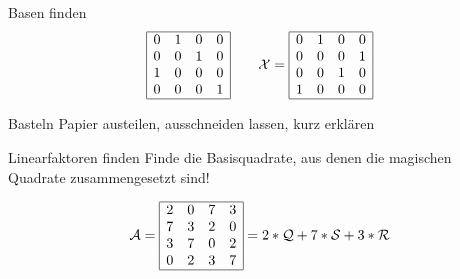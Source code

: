 \documentclass{uebungszettel}
\begin{document}
\begin{aufgabe}{Basen finden}
\begin{align*}
\begin{array}{|cccc|}
		\hline
			0 & 1 & 0 & 0 \\ 
			0 & 0 & 1 & 0 \\ 
			1 & 0 & 0 & 0 \\ 
			0 & 0 & 0 & 1 \\
		\hline
		\end{array}
	\qquad
	\mathcal{X} = 
		\begin{array}{|cccc|}
		\hline
			0 & 1 & 0 & 0 \\ 
			0 & 0 & 0 & 1 \\ 
			0 & 0 & 1 & 0 \\ 
			1 & 0 & 0 & 0 \\
		\hline
		\end{array}   
	 \end{align*}	
\end{aufgabe}

\begin{aufgabe}{Basteln}
	Papier austeilen, ausschneiden lassen, kurz erkl\"aren
\end{aufgabe}

\begin{aufgabe}{Linearfaktoren finden}
	Finde die Basisquadrate, aus denen die magischen Quadrate zusammengesetzt sind!

	\begin{align*}
		\mathcal{A} =
		\begin{array}{|cccc|}
		\hline
			2 & 0 & 7 & 3 \\ 
			7 & 3 & 2 & 0 \\ 
			3 & 7 & 0 & 2 \\ 
			0 & 2 & 3 & 7 \\
		\hline
		\end{array}  
		= 2*\mathcal{Q} + 7*\mathcal{S} + 3*\mathcal{R}
	\end{align*}
\end{aufgabe}
\end{document}
